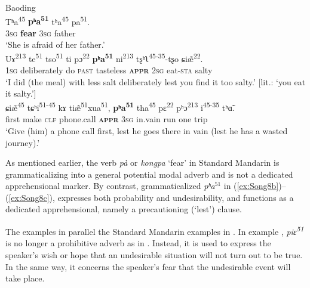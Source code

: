 \documentclass[output=paper,colorlinks,citecolor=brown, language=chinese]{langscibook}
\begin{document}
\ea \label{ex:Song8} \textnormal{Baoding}\\
\ea \label{ex:Song8a}
\gll Tʰa\textsuperscript{45} \textbf{pʰa\textsuperscript{51}} tʰa\textsuperscript{45} pa\textsuperscript{51}. \\
\textsc{3sg} \textbf{fear} \textsc{3sg} father \\
\glt `She is afraid of her father.' \\
\ex \label{ex:Song8b}
\gll Uɤ\textsuperscript{213} te\textsuperscript{51} tso\textsuperscript{51} ti pɔ\textsuperscript{22} \textbf{pʰa\textsuperscript{51}} ni\textsuperscript{213} tʂʰʅ\textsuperscript{45-35}-tʂo ɕiæ̃\textsuperscript{22}. \\
\textsc{1sg} deliberately do \textsc{past} tasteless \textsc{\textbf{appr}} \textsc{2sg} eat-\textsc{sta} salty \\
\glt `I did (the meal) with less salt deliberately lest you find it too salty.' [lit.: `you eat it salty.'] \\
\ex \label{ex:Song8c}
\gll ɕiæ̃\textsuperscript{45} tɕʰi\textsuperscript{51-45} kɤ tiæ̃\textsuperscript{51}xua\textsuperscript{51}, \textbf{pʰa\textsuperscript{51}} tha\textsuperscript{45} pɛ\textsuperscript{22} pʰɔ\textsuperscript{213} i\textsuperscript{45-35} tʰɑ̃. \\
first make \textsc{clf} phone.call \textsc{\textbf{appr}} \textsc{3sg} in.vain run one trip \\
\glt `Give (him) a phone call first, lest he goes there in vain (lest he has a wasted journey).'
\z
\z

 As mentioned earlier, the verb \textit{pà} or \textit{kongpa} `fear' in Standard Mandarin is grammaticalizing into a general potential modal adverb and is not a dedicated apprehensional marker. By contrast, grammaticalized \textit{pʰa$^{51}$} in (\ref{ex:Song8b})--(\ref{ex:Song8c}), expresses both probability and undesirability, and functions as a dedicated apprehensional, namely a precautioning (`lest') clause.


The examples in  parallel the Standard Mandarin examples in . In example , \textit{piɛ\textsuperscript{51}} is no longer a prohibitive adverb as in . Instead, it is used to express the speaker's wish or hope that an undesirable situation will not turn out to be true. In the same way, it concerns the speaker's fear that the undesirable event will take place. 
\end{document}

